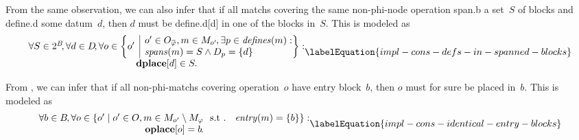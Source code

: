 From the same observation, we can also infer that if all \glspl{match} covering
the same non-\gls{phi-node} \gls{operation} \gls{span.b} a set~$S$ of
\glspl{block} and \gls{define.d} some \gls{datum}~$d$\hspace{-1pt}, then $d$
must be \gls{define.d}[d] in one of the \glspl{block} in~$S$\hspace{-.8pt}.
%
This is modeled as
%
\begin{equation}
  \begin{array}{@{}c@{}}
    \forall S \in \mPowerset{\mBlockSet} \hspace{-2pt},
    \forall d \in \mDataSet \!,
    \forall o \in
      \mSetBuilder*{o'}%
                   {
                     \begin{array}{@{}l@{}}
                       o' \in \mOpCompSet{\mPhi},
                       m \in \mMatchSet[o'] \hspace{-1pt},
                       \exists p \in \mDefines(m) : \\
                       \mSpans(m) = S \mAnd \mDataSet[p] = \mSet{d}
                     \end{array}
                   } : \\
    \mVar{dplace}[d] \in S.
  \end{array}
  \labelEquation{impl-cons-defs-in-spanned-blocks}
\end{equation}

From , we can infer that if all
non-\glspl{phi-match} covering \gls{operation}~$o$ have \gls{entry
  block}~$b$\hspace{-1pt}, then $o$ must for sure be placed in~$b$\hspace{-1pt}.
%
This is modeled as
%
\begin{equation}
  \begin{array}{@{}c@{}}
    \forall b \in \mBlockSet \hspace{-1pt},
    \forall o \in
      \mSetBuilder{o'}%
                  {
                    o' \in \mOpSet,
                    m \in \mMatchSet[o'] \setminus \mPhiMatchSet
                    \text{ \st }
                    \mEntry(m) = \mSet{b}
                  } : \\
    \mVar{oplace}[o] = b \hspace{-1pt}.
  \end{array}
  \labelEquation{impl-cons-identical-entry-blocks}
\end{equation}

